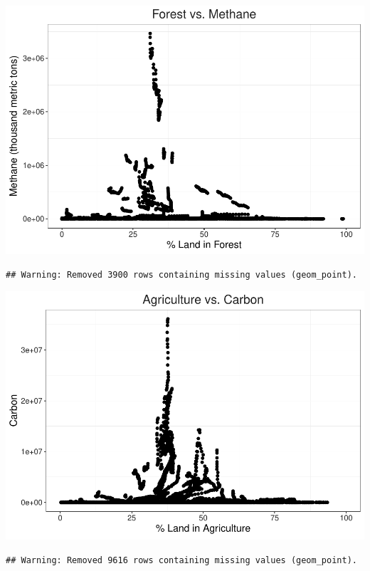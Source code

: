 \documentclass[12pt,]{article}
\begin{document}
\includegraphics{Marx_ENV872_Project_files/figure-latex/unnamed-chunk-5-2.pdf}

\begin{verbatim}
## Warning: Removed 3900 rows containing missing values (geom_point).
\end{verbatim}

\includegraphics{Marx_ENV872_Project_files/figure-latex/unnamed-chunk-5-3.pdf}

\begin{verbatim}
## Warning: Removed 9616 rows containing missing values (geom_point).
\end{verbatim}
\end{document}
